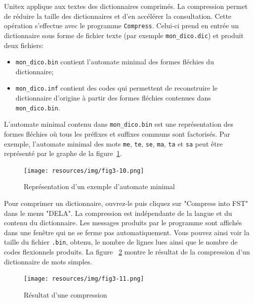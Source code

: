 Unitex applique aux textes des dictionnaires comprimés. La compression permet de réduire
la taille des dictionnaires et d’en accélérer la consultation. Cette opération s’effectue
avec le programme \verb+Compress+. 
Celui-ci prend en entrée un dictionnaire sous forme de fichier texte (par exemple
	\verb+mon_dico.dic+) et produit deux fichiers:

\begin{itemize}
  \item \verb+mon_dico.bin+ contient l’automate minimal des formes fléchies du dictionnaire;
  \item \verb+mon_dico.inf+ contient des codes qui permettent de
  	  reconstruire le dictionnaire d’origine à partir
  	  des formes fléchies contenues dans \verb+mon_dico.bin+.
\end{itemize}

\noindent L’automate minimal contenu dans \verb+mon_dico.bin+ est une représentation des formes
fléchies où tous les préfixes et suffixes
communs sont factorisés. Par exemple, l’automate minimal des mots \verb+me+, \verb+te+, \verb+se+,
\verb+ma+, \verb+ta+ et \verb+sa+
peut être représenté par le graphe de la figure~\ref{fig-example-minimal-automaton}.
\bigskip \begin{figure}[!ht]
\begin{center}
\texttt{[image: resources/img/fig3-10.png]}
\caption{Représentation d’un exemple d’automate minimal\label{fig-example-minimal-automaton}}
\end{center}
\end{figure}

\noindent    Pour comprimer un dictionnaire, ouvrez-le puis cliquez sur "Compress into FST" dans le
menu "DELA". La compression est indépendante de la langue et du contenu du dictionnaire.
Les messages produits par le programme sont affichés dans une fenêtre qui ne se ferme pas
automatiquement. Vous pouvez ainsi voir la taille du fichier
\verb+.bin+, obtenu, le nombre de lignes lues ainsi que le nombre de codes flexionnels produits. La
figure ~\ref{fig-compression-result}
montre le résultat de la compression d’un dictionnaire de mots simples.

\bigskip
\begin{figure}[!ht]
\begin{center}
\texttt{[image: resources/img/fig3-11.png]}
\caption{Résultat d’une compression\label{fig-compression-result}}
\end{center}
\end{figure}

